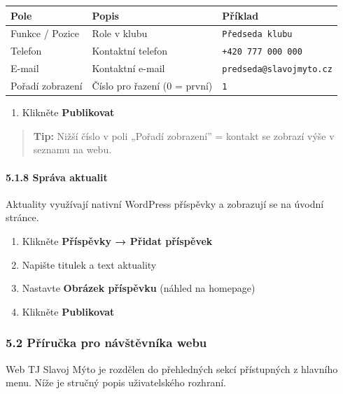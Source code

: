 {\def\LTcaptype{none} %
\begin{longtable}[]{@{}lll@{}}
\toprule\noalign{}
Pole & Popis & Příklad \\
\midrule\noalign{}
\endhead
\bottomrule\noalign{}
\endlastfoot
Funkce / Pozice & Role v klubu & \texttt{Předseda\ klubu} \\
Telefon & Kontaktní telefon & \texttt{+420\ 777\ 000\ 000} \\
E-mail & Kontaktní e-mail & \texttt{predseda@slavojmyto.cz} \\
Pořadí zobrazení & Číslo pro řazení (0 = první) & \texttt{1} \\
\end{longtable}
}

\begin{enumerate}
\def\labelenumi{\arabic{enumi}.}
\setcounter{enumi}{3}
\tightlist
\item
  Klikněte \textbf{Publikovat}
\end{enumerate}

\begin{quote}
\textbf{Tip:} Nižší číslo v poli „Pořadí zobrazení'' = kontakt se
zobrazí výše v seznamu na webu.
\end{quote}

\paragraph{5.1.8 Správa aktualit}\label{spruxe1va-aktualit}

Aktuality využívají nativní WordPress příspěvky a zobrazují se na úvodní
stránce.

\begin{enumerate}
\def\labelenumi{\arabic{enumi}.}
\tightlist
\item
  Klikněte \textbf{Příspěvky → Přidat příspěvek}
\item
  Napište titulek a text aktuality
\item
  Nastavte \textbf{Obrázek příspěvku} (náhled na homepage)
\item
  Klikněte \textbf{Publikovat}
\end{enumerate}

\subsubsection{5.2 Příručka pro návštěvníka
webu}\label{pux159uxedruux10dka-pro-nuxe1vux161tux11bvnuxedka-webu}

Web TJ Slavoj Mýto je rozdělen do přehledných sekcí přístupných z
hlavního menu. Níže je stručný popis uživatelského rozhraní.

